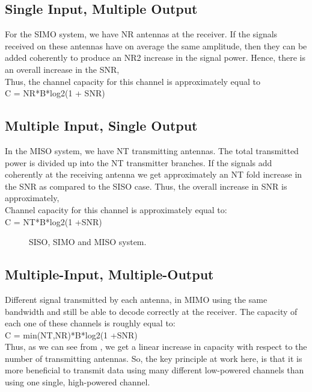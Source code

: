 \documentclass[12pt]{report}
\begin{document}
\subsection*{Single Input, Multiple Output}
For the SIMO system, we have NR antennas at the receiver. If the signals
received on these antennas have on average the same amplitude, then
they can be added coherently to produce an NR2 increase in the signal
power. Hence, there is an overall increase in the SNR,\\
Thus, the channel capacity for this channel is approximately equal to\\
C = NR*B*log2(1 + SNR)
\subsection*{Multiple Input, Single Output}
In the MISO system, we have NT transmitting antennas. The total
transmitted power is divided up into the NT transmitter branches. If the
signals add coherently at the receiving antenna we get approximately
an NT fold increase in the SNR as compared to the SISO case. Thus,
the overall increase in SNR is approximately,\\
Channel capacity for this channel is approximately equal to:\\
C = NT*B*log2(1 +SNR)


\begin{figure}[!hbt]
		\begin{center}
		\caption{SISO, SIMO and MISO system.}
		\label{fig:tf_plot}
		\end{center}
	\end{figure}
    \subsection*{Multiple-Input, Multiple-Output}
Different signal transmitted by each antenna, in MIMO using the same
bandwidth and still be able to decode correctly at the receiver. The
capacity of each one of these channels is roughly equal to:\\
C = min(NT,NR)*B*log2(1 +SNR)\\	
Thus, as we can see from , we get a linear increase in capacity with respect to the number of transmitting antennas. So, the key principle at
work here, is that it is more beneficial to transmit data using many different low-powered channels than using one single, high-powered channel.
\end{document}
